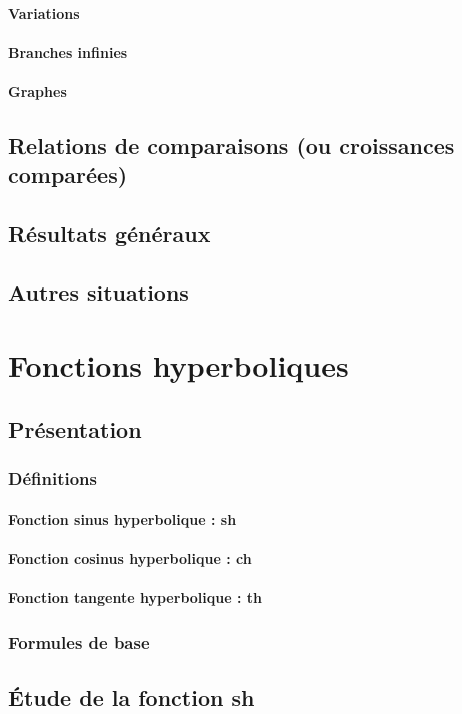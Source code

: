 \documentclass[12pt,a4paper,french]{book}
\begin{document}
			\subsubsection{Variations}
			\subsubsection{Branches infinies}
			\subsubsection{Graphes}
	\section{Relations de comparaisons  (ou croissances comparées)}
		\section{Résultats généraux}
		\section{Autres situations}
\chapter{Fonctions hyperboliques}
	\section{Présentation}
		\subsection{Définitions}
			\subsubsection{Fonction sinus hyperbolique : sh}
			\subsubsection{Fonction cosinus hyperbolique : ch}
			\subsubsection{Fonction tangente hyperbolique : th}
		\subsection{Formules de base}
	\section{Étude de la fonction sh}
\end{document}

